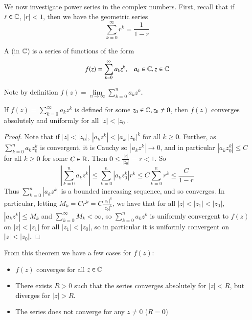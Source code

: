 We now investigate power series in the complex numbers. First, recall that if $r \in \mathbb C$, $|r| < 1$, then we have the geometric series \begin{equation*}
    \sum_{k=0}^{\infty}r^k = \frac{1}{1-r}
\end{equation*}

\begin{definition}
    A  (in $\mathbb C$) is a series of functions of the form \begin{equation*}
        f(z) = \sum_{k=0}^{\infty}a_kz^k,\;\;\;a_k \in \mathbb C, z \in \mathbb C
    \end{equation*}
\end{definition}
Note by definition $f(z) = \lim\limits_{n\rightarrow \infty}\sum_{k=0}^na_kz^k$.

\begin{proposition}\label{prop:3.3.1}
    If $f(z) = \sum_{k=0}^{\infty}a_kz^k$ is defined for some $z_0 \in \mathbb C, z_0 \neq 0$, then $f(z)$ converges absolutely and uniformly for all $|z| < |z_0|$.
\end{proposition}
\begin{proof}
    Note that if $|z| < |z_0|$, $|a_kz^k| < |a_k||z_0|^k$ for all $k \geq 0$. Further, as $\sum_{k=0}^na_kz_0^k$ is convergent, it is Cauchy so $|a_kz^k|\rightarrow 0$, and in particular $|a_kz_0^k| \leq C$ for all $ k\geq 0$ for some $C \in \mathbb R$. Then $0 \leq \frac{|z|}{|z_0|} = r < 1$. So $$\left|\sum_{k=0}^na_kz^k\right| \leq \sum_{k=0}^n|a_kz_0^k|r^k \leq C\sum_{k=0}^nr^k \leq \frac{C}{1-r}$$ Thus $\sum_{k=0}^n|a_kz^k|$ is a bounded increasing sequence, and so converges. In particular, letting $M_k = Cr^k = C\frac{|z_1|^k}{|z_0|^k}$, we have that for all $|z| < |z_1| < |z_0|$, $|a_kz^k| \leq M_k$ and $\sum_{k=0}^{\infty}M_k < \infty$, so $\sum_{k=0}^na_kz^k$ is uniformly convergent to $f(z)$ on $|z| < |z_1|$ for all $|z_1| < |z_0|$, so in particular it is uniformly convergent on $|z| < |z_0|$.
\end{proof}

From this theorem we have a few cases for $f(z)$: \begin{itemize}
    \item $f(z)$ converges for all $z \in \mathbb C$
    \item There exists $R  > 0$ such that the series converges absolutely for $|z| < R$, but diverges for $|z| > R$.
    \item The series does not converge for any $z \neq 0$ ($R = 0$)
\end{itemize}

